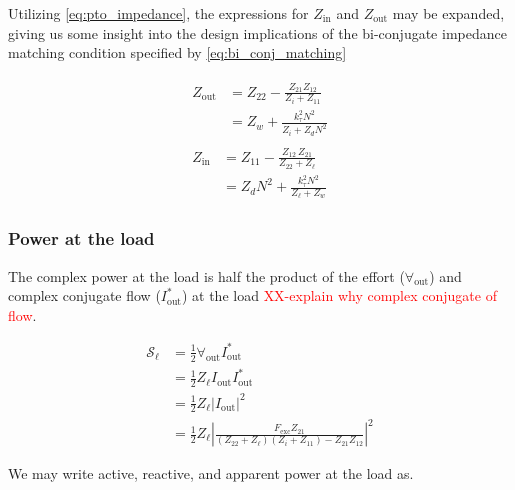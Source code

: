 \documentclass[lettersize,journal]{IEEEtran}
\newcommand{\rc}[1]{\textcolor{red}{#1}}
\begin{document}
\noindent{}Utilizing \eqref{eq:pto_impedance}, the expressions for $Z_{\textrm{in}}$ and $Z_{\textrm{out}}$ may be expanded, giving us some insight into the design implications of the bi-conjugate impedance matching condition specified by \eqref{eq:bi_conj_matching}

\begin{subequations}
\begin{align}
        \begin{split}
                Z_{\textrm{out}} &= Z_{22} - \frac{Z_{21} Z_{12}}{Z_{i} + Z_{11}} \\[0.5em]
                &=Z_w + \frac{k_\tau^2 N^2}{Z_i + Z_d N^2}
        \end{split}\label{eq:expanded_zin} \\[1em]
        \begin{split}
                Z_{\textrm{in}} &= Z_{11} - \frac{Z_{12} \, Z_{21}}{Z_{22} + Z_\ell} \\[0.5em]
                &= Z_d N^2 + \frac{k_\tau^2 N^2}{Z_\ell + Z_w}
        \end{split}\label{eq:expanded_zout}
\end{align}
\end{subequations}

\subsubsection{Power at the load}\label{sec:power_at_the_load}
The complex power at the load is half the product of the effort ($\forall_{\textrm{out}}$) and complex conjugate flow ($I_{\textrm{out}}^*$) at the load \rc{XX-explain why complex conjugate of flow}.

\begin{equation}
\begin{aligned}
        \mathcal{S}_{\ell} 
        &= \frac{1}{2} \forall_{\textrm{out}} I_{\textrm{out}}^* \\
        &= \frac{1}{2} Z_\ell I_{\textrm{out}} I_{\textrm{out}}^* \\
        &= \frac{1}{2} Z_\ell | I_{\textrm{out}} |^2 \\
        &= \frac{1}{2} Z_\ell \left| \frac{F_{\textrm{exc}} Z_{21}}{ ( Z_{22} + Z_\ell ) (Z_i + Z_{11}) - Z_{21} Z_{12}  } \right|^2 
\end{aligned}
\end{equation}

\noindent{}We may write active, reactive, and apparent power at the load as.
\end{document}
